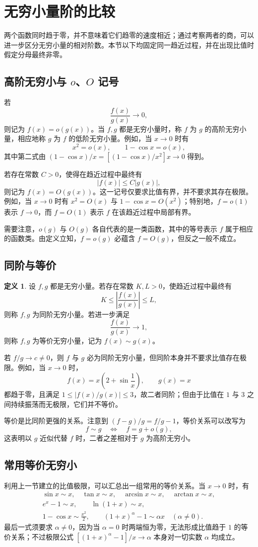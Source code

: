 \documentclass[UTF8,fontset=fandol,a4paper,12pt]{ctexart}
\theoremstyle{definition}
\newtheorem*{definition}{定义}
\begin{document}
\section{无穷小量阶的比较}
两个函数同时趋于零，并不意味着它们趋零的速度相近；通过考察两者的商，可以进一步区分无穷小量的相对阶数。本节以下均固定同一趋近过程，并在出现比值时假定分母最终非零。

\subsection*{高阶无穷小与 $o$、$O$ 记号}
若
\[
 \frac{f(x)}{g(x)}\to0,
\]
则记为 $f(x)=o(g(x))$。当 $f,g$ 都是无穷小量时，称 $f$ 为 $g$ 的高阶无穷小量，相应地称 $g$ 为 $f$ 的低阶无穷小量。例如，当 $x\to0$ 时有
\[
 x^2=o(x),\qquad 1-\cos x=o(x),
\]
其中第二式由 $(1-\cos x)/x=[(1-\cos x)/x^2]x\to0$ 得到。

若存在常数 $C>0$，使得在趋近过程中最终有
\[
 |f(x)|\le C|g(x)|,
\]
则记为 $f(x)=O(g(x))$。这一记号仅要求比值有界，并不要求其存在极限。例如，当 $x\to0$ 时有 $x^2=O(x)$ 与 $1-\cos x=O(x^2)$；特别地，$f=o(1)$ 表示 $f\to0$，而 $f=O(1)$ 表示 $f$ 在该趋近过程中局部有界。

需要注意，$o(g)$ 与 $O(g)$ 各自代表的是一类函数，其中的等号表示 $f$ 属于相应的函数类。由定义立知，$f=o(g)$ 必蕴含 $f=O(g)$，但反之一般不成立。

\subsection*{同阶与等价}
\begin{definition}
设 $f,g$ 都是无穷小量。若存在常数 $K,L>0$，使趋近过程中最终有
\[
 K\le\left|\frac{f(x)}{g(x)}\right|\le L,
\]
则称 $f,g$ 为同阶无穷小量。若进一步满足
\[
 \frac{f(x)}{g(x)}\to1,
\]
则称 $f,g$ 为等价无穷小量，记为 $f(x)\sim g(x)$。
\end{definition}

若 $f/g\to c\ne0$，则 $f$ 与 $g$ 必为同阶无穷小量，但同阶本身并不要求比值存在极限。例如，当 $x\to0$ 时，
\[
 f(x)=x\left(2+\sin\frac1x\right),\qquad g(x)=x
\]
都趋于零，且满足 $1\le|f(x)/g(x)|\le3$，故二者同阶；但由于比值在 $1$ 与 $3$ 之间持续振荡而无极限，它们并不等价。

等价是比同阶更强的关系。注意到 $(f-g)/g=f/g-1$，等价关系可以改写为
\[
 f\sim g\quad\Longleftrightarrow\quad f=g+o(g),
\]
这表明以 $g$ 近似代替 $f$ 时，二者之差相对于 $g$ 为高阶无穷小。

\subsection*{常用等价无穷小}
利用上一节建立的比值极限，可以汇总出一组常用的等价关系。当 $x\to0$ 时，有
\[
 \begin{gathered}
 \sin x\sim x,\quad \tan x\sim x,\quad
 \arcsin x\sim x,\quad \arctan x\sim x,\\
 e^x-1\sim x,\qquad\ln(1+x)\sim x,\\
 1-\cos x\sim\frac{x^2}{2},\qquad
 (1+x)^\alpha-1\sim\alpha x\quad(\alpha\ne0).
 \end{gathered}
\]
最后一式须要求 $\alpha\ne0$，因为当 $\alpha=0$ 时两端恒为零，无法形成比值趋于 $1$ 的等价关系；不过极限公式 $[(1+x)^\alpha-1]/x\to\alpha$ 本身对一切实数 $\alpha$ 均成立。
\end{document}
